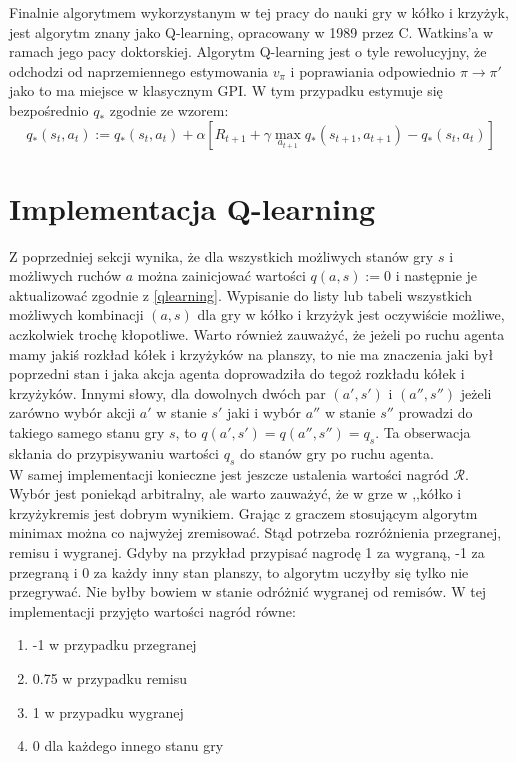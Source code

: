 \documentclass[licencjacka]{pracamgr}
\begin{document}
 Finalnie algorytmem wykorzystanym w tej pracy do nauki gry w kółko i krzyżyk, jest algorytm znany jako Q-learning, opracowany w 1989 przez C. Watkins'a \cite{Watkins} w ramach jego pacy doktorskiej. Algorytm Q-learning jest o tyle rewolucyjny, że odchodzi od naprzemiennego estymowania $v_{\pi}$ i poprawiania odpowiednio $\pi\rightarrow \pi'$ jako to ma miejsce w klasycznym GPI. W tym przypadku estymuje się bezpośrednio $q_{*}$ zgodnie ze wzorem:
 \begin{equation}\label{qlearning}
 	 q_{*}(s_{t}, a_{t}) := q_{*}(s_{t},a_{t}) +\alpha [R_{t+1} + \gamma \max_{a_{t+1}} q_{*}(s_{t+1}, a_{t+1}) - q_{*}(s_{t},a_{t})]
 \end{equation} 
 


\section{Implementacja Q-learning}

Z poprzedniej sekcji wynika, że dla wszystkich możliwych stanów gry $s$ i możliwych ruchów $a$ można zainicjować wartości $q(a,s):=0$ i następnie je aktualizować zgodnie z \ref{qlearning}. Wypisanie do listy lub tabeli wszystkich możliwych kombinacji $(a,s)$ dla gry w kółko i krzyżyk jest oczywiście możliwe, aczkolwiek trochę kłopotliwe. Warto również zauważyć, że jeżeli po ruchu agenta  mamy jakiś rozkład kółek i krzyżyków na planszy, to nie ma znaczenia jaki był poprzedni stan i jaka akcja agenta doprowadziła do tegoż rozkładu kółek i krzyżyków. Innymi słowy, dla dowolnych dwóch par $(a', s')$ i $(a'', s'')$  jeżeli zarówno wybór akcji $a'$ w stanie $s'$ jaki i wybór $a''$ w stanie $s''$ prowadzi do takiego samego stanu gry $s$,  to $q(a', s') = q(a'', s'') = q_{s}$. Ta obserwacja skłania do przypisywaniu wartości $q_{s}$ do stanów gry po ruchu agenta. \\

W samej implementacji konieczne jest jeszcze ustalenia wartości nagród $\mathcal{R}$.  Wybór jest poniekąd arbitralny, ale warto zauważyć, że w grze w ,,kółko i krzyżyk\textquotedbl\enspace remis jest dobrym wynikiem. Grając z graczem stosującym algorytm minimax można co najwyżej zremisować. Stąd potrzeba rozróżnienia przegranej, remisu i wygranej. Gdyby na przykład przypisać nagrodę 1 za wygraną, -1 za przegraną i 0 za każdy inny stan planszy, to algorytm uczyłby się tylko nie przegrywać. Nie byłby bowiem w stanie odróżnić wygranej od remisów. W tej implementacji przyjęto wartości nagród równe: 
\begin{enumerate}
	\item{-1 w przypadku przegranej}
	\item{0.75 w przypadku remisu}
	\item{1 w przypadku wygranej}
	\item{0 dla każdego innego stanu gry}
\end{enumerate}
\end{document}
